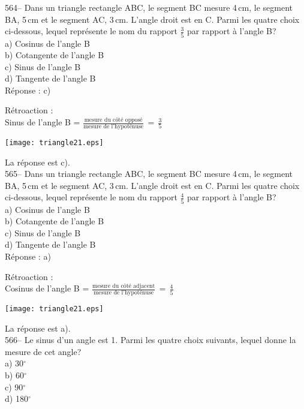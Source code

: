 ﻿\documentclass[letterpaper, 12pt]{article}
\begin{document}
564-- Dans un triangle rectangle ABC, le segment BC mesure 4\,cm, le segment
BA, 5\,cm et le segment AC, 3\,cm.  L'angle droit est en C.  Parmi les
quatre choix ci-dessous, lequel repr\'esente le nom du rapport $\frac{3}{5}$
par rapport \`a l'angle B?\\
a) Cosinus de l'angle B\\
b) Cotangente de l'angle B\\
c) Sinus de l'angle B\\
d) Tangente de l'angle B\\

R\'eponse : c)

R\'etroaction : \\
Sinus de l'angle B = $\frac{\textrm{mesure du c\^ot\'e
oppos\'e}}{\textrm{mesure de
l'hypot\'enuse}}\,=\,\frac{\textrm{3}}{\textrm{5}}$\\
\begin{center}
    \texttt{[image: triangle21.eps]}
    \end{center}
La r\'eponse est c).\\

565-- Dans un triangle rectangle ABC, le segment BC mesure 4\,cm, le segment
BA, 5\,cm et le segment AC, 3\,cm.  L'angle droit est en C.  Parmi les
quatre choix ci-dessous, lequel repr\'esente le nom du rapport $\frac{4}{5}$
par rapport \`a l'angle B?\\
a) Cosinus de l'angle B\\
b) Cotangente de l'angle B\\
c) Sinus de l'angle B\\
d) Tangente de l'angle B\\

R\'eponse : a)

R\'etroaction : \\
Cosinus de l'angle B = $\frac{\textrm{mesure du c\^ot\'e
adjacent}}{\textrm{mesure de
l'hypot\'enuse}}\,=\,\frac{\textrm{4}}{\textrm{5}}$\\
\begin{center}
    \texttt{[image: triangle21.eps]}
    \end{center}
La r\'eponse est a).\\

566-- Le sinus d'un angle est 1.  Parmi les quatre choix suivants, lequel
donne la mesure de cet angle?\\
a) 30$^{\circ}$\\
b) 60$^{\circ}$\\
c) 90$^{\circ}$\\
d) 180$^{\circ}$\\
\end{document}
